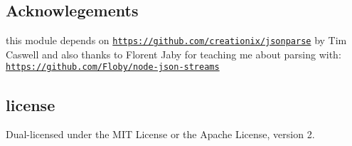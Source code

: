 \subsection*{Acknowlegements}

this module depends on \href{https://github.com/creationix/jsonparse}{\tt https\+://github.\+com/creationix/jsonparse} by Tim Caswell and also thanks to Florent Jaby for teaching me about parsing with\+: \href{https://github.com/Floby/node-json-streams}{\tt https\+://github.\+com/\+Floby/node-\/json-\/streams}

\subsection*{license}

Dual-\/licensed under the M\+IT License or the Apache License, version 2. 